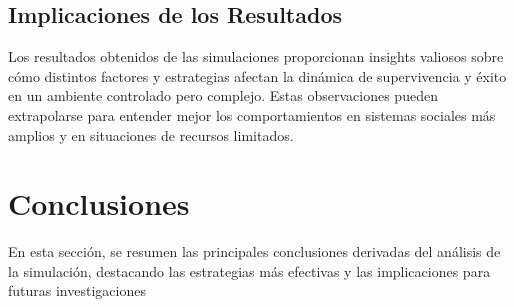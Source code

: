 \documentclass[11pt]{article}
\begin{document}
\subsection{Implicaciones de los Resultados}
Los resultados obtenidos de las simulaciones proporcionan insights valiosos sobre cómo distintos factores y estrategias afectan la dinámica de supervivencia y éxito en un ambiente controlado pero complejo. Estas observaciones pueden extrapolarse para entender mejor los comportamientos en sistemas sociales más amplios y en situaciones de recursos limitados.

\section{Conclusiones}
En esta sección, se resumen las principales conclusiones derivadas del análisis de la simulación, destacando las estrategias más efectivas y las implicaciones para futuras investigaciones
\end{document}
